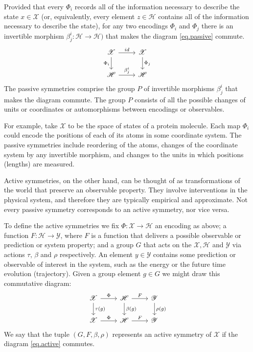 \documentclass[]{article} %
\renewcommand{\mathcal}[1]{\mathscr{#1}} %
\begin{document}
Provided that every $\Phi_i$ records all of the information necessary to describe the state $x\in \mathcal{X}$ (or, equivalently, every element $z\in \mathcal{H}$ contains all of the information necessary to describe the state),
for any two encodings $\Phi_i$ and $\Phi_j$ there is an invertible morphism $\beta_j^i:\mathcal{H}\to\mathcal{H})$ that makes the diagram \eqref{eq.passive} commute.
\begin{equation}\label{eq.passive}
\begin{tikzcd}[every label/.append ]
  {\mathcal{X}}\arrow[r, "id"] \arrow[d,"\Phi_i",swap] & {\mathcal{X}}  \arrow[d,"\Phi_j"]\\
{\mathcal{H}} \arrow[r, "\beta_j^i"]  & {\mathcal{H}} 
\end{tikzcd}
\end{equation}
The passive symmetries comprise the group $P$ of invertible morphisms $\beta_j^i$ that makes the diagram commute.
The group $P$ consists of all the possible changes of units or coordinates or automorphisms between encodings or observables. 

For example, take $\mathcal{X}$ to be the space of states of a protein molecule.
Each map $\Phi_i$ could encode the positions of each of its atoms in some coordinate system.
The passive symmetries include reordering of the atoms, changes of the coordinate system by any invertible morphism, and changes to the units in which positions (lengths) are measured.

Active symmetries, on the other hand, can be thought of as transformations of the world that preserve an observable property.
They involve interventions in the physical system, and therefore they are typically empirical and approximate.
Not every passive symmetry corresponds to an active symmetry, nor vice versa.

To define the active symmetries we fix $\Phi:\mathcal X \to \mathcal{H}$ an encoding as above; a function $F: \mathcal H \to \mathcal Y$, where $F$ is a function that delivers a possible observable or prediction or system property; and a group $G$ that acts on the $\mathcal X, \mathcal H$ and $\mathcal Y$ via actions $\tau$, $\beta$ and $\rho$ respectively.
An element $y\in\mathcal{Y}$ contains some prediction or observable of interest in the system, such as the energy or the future time evolution (trajectory).
Given a group element $g\in G$ we might draw this commutative diagram:
\begin{equation}\label{eq.active}
\begin{tikzcd}[every label/.append]
  {\mathcal X}\arrow[r,"\Phi"] \arrow[d,"\tau(g)"] 
  & 
  {\mathcal H}  \arrow[d,"\beta(g)"] \arrow[r,"F"]
  & 
  {\mathcal Y}  \arrow[d,"\rho(g)"]
  \\
{\mathcal X} \arrow[r,"\Phi"]  
& 
{\mathcal H} \arrow[r,"F"]
&
{\mathcal Y} 
\end{tikzcd}
\end{equation}
We say that the tuple $(G, F, \beta, \rho)$ represents an active symmetry of $\mathcal X$ if the diagram \eqref{eq.active} commutes.
\end{document}
